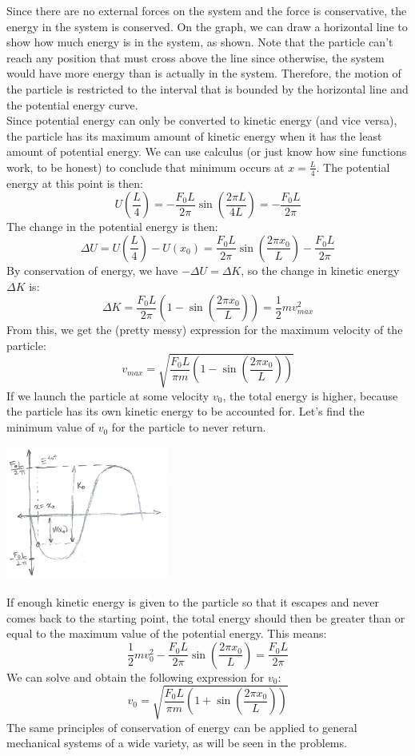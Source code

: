 Since there are no external forces on the system and the force is conservative, the energy in the system is conserved. On the graph, we can draw a horizontal line to show how much energy is in the system, as shown. Note that the particle can't reach any position that must cross above the line since otherwise, the system would have more energy than is actually in the system. Therefore, the motion of the particle is restricted to the interval that is bounded by the horizontal line and the potential energy curve. \\
Since potential energy can only be converted to kinetic energy (and vice versa), the particle has its maximum amount of kinetic energy when it has the least amount of potential energy. We can use calculus (or just know how sine functions work, to be honest) to conclude that minimum occurs at $x = \frac{L}{4}$. The potential energy at this point is then:
\[
	U\left(\frac{L}{4}\right) = - \frac{F_0L}{2\pi} \sin \left(\frac{2\pi L}{4L} \right) = - \frac{F_0L}{2\pi}
\]
The change in the potential energy is then:
\[
	\Delta U = U\left(\frac{L}{4}\right) - U(x_0)= \frac{F_0L}{2\pi} \sin \left(\frac{2\pi x_0}{L} \right) - \frac{F_0L}{2\pi}
\]
By conservation of energy, we have $- \Delta U = \Delta K$, so the change in kinetic energy $\Delta K$ is:
\[
	\Delta K = \frac{F_0L}{2\pi}\left(1 - \sin \left(\frac{2\pi x_0}{L} \right)\right)= \frac{1}{2}mv_{max}^2
\]
From this, we get the (pretty messy) expression for the maximum velocity of the particle:
\[
	v_{max} = \sqrt{\frac{F_0L}{\pi m}\left(1 - \sin \left(\frac{2\pi x_0}{L} \right)\right)}
\]
If we launch the particle at some velocity $v_0$, the total energy is higher, because the particle has its own kinetic energy to be accounted for. Let's find the minimum value of $v_0$ for the particle to never return. 
\begin{center}
	\includegraphics[width=0.4\textwidth]{images/mechintro/cons-energy-2.png}\\
\end{center}
If enough kinetic energy is given to the particle so that it escapes and never comes back to the starting point, the total energy should then be greater than or equal to the maximum value of the potential energy. This means:
\[
	\frac{1}{2}mv_0^2 - \frac{F_0L}{2\pi} \sin \left(\frac{2\pi x_0}{L} \right) = \frac{F_0L}{2\pi}
\]
We can solve and obtain the following expression for $v_0$:
\[
	v_0 = \sqrt{\frac{F_0L}{\pi m} \left(1 + \sin \left(\frac{2\pi x_0}{L} \right) \right)}
\]
The same principles of conservation of energy can be applied to general mechanical systems of a wide variety, as will be seen in the problems.  
